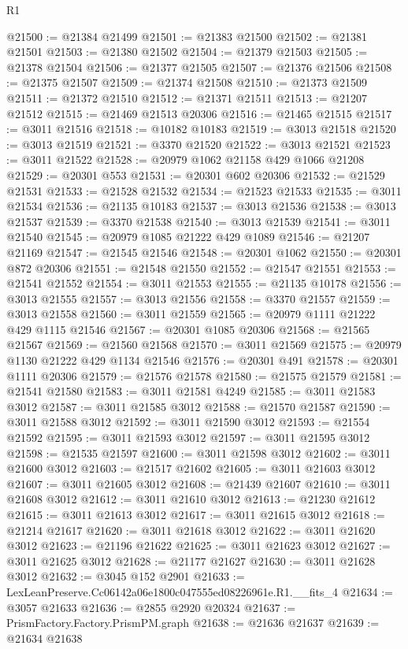 \begin{lexlean}{R1}
\begin{coremodule}
@21500 := @21384 @21499
@21501 := @21383 @21500
@21502 := @21381 @21501
@21503 := @21380 @21502
@21504 := @21379 @21503
@21505 := @21378 @21504
@21506 := @21377 @21505
@21507 := @21376 @21506
@21508 := @21375 @21507
@21509 := @21374 @21508
@21510 := @21373 @21509
@21511 := @21372 @21510
@21512 := @21371 @21511
@21513 := @21207 @21512
@21515 := @21469 @21513 @20306
@21516 := @21465 @21515
@21517 := @3011 @21516
@21518 := @10182 @10183
@21519 := @3013 @21518
@21520 := @3013 @21519
@21521 := @3370 @21520
@21522 := @3013 @21521
@21523 := @3011 @21522
@21528 := @20979 @1062 @21158 @429 @1066 @21208
@21529 := @20301 @553
@21531 := @20301 @602 @20306
@21532 := @21529 @21531
@21533 := @21528 @21532
@21534 := @21523 @21533
@21535 := @3011 @21534
@21536 := @21135 @10183
@21537 := @3013 @21536
@21538 := @3013 @21537
@21539 := @3370 @21538
@21540 := @3013 @21539
@21541 := @3011 @21540
@21545 := @20979 @1085 @21222 @429 @1089
@21546 := @21207 @21169
@21547 := @21545 @21546
@21548 := @20301 @1062
@21550 := @20301 @872 @20306
@21551 := @21548 @21550
@21552 := @21547 @21551
@21553 := @21541 @21552
@21554 := @3011 @21553
@21555 := @21135 @10178
@21556 := @3013 @21555
@21557 := @3013 @21556
@21558 := @3370 @21557
@21559 := @3013 @21558
@21560 := @3011 @21559
@21565 := @20979 @1111 @21222 @429 @1115 @21546
@21567 := @20301 @1085 @20306
@21568 := @21565 @21567
@21569 := @21560 @21568
@21570 := @3011 @21569
@21575 := @20979 @1130 @21222 @429 @1134 @21546
@21576 := @20301 @491
@21578 := @20301 @1111 @20306
@21579 := @21576 @21578
@21580 := @21575 @21579
@21581 := @21541 @21580
@21583 := @3011 @21581 @4249
@21585 := @3011 @21583 @3012
@21587 := @3011 @21585 @3012
@21588 := @21570 @21587
@21590 := @3011 @21588 @3012
@21592 := @3011 @21590 @3012
@21593 := @21554 @21592
@21595 := @3011 @21593 @3012
@21597 := @3011 @21595 @3012
@21598 := @21535 @21597
@21600 := @3011 @21598 @3012
@21602 := @3011 @21600 @3012
@21603 := @21517 @21602
@21605 := @3011 @21603 @3012
@21607 := @3011 @21605 @3012
@21608 := @21439 @21607
@21610 := @3011 @21608 @3012
@21612 := @3011 @21610 @3012
@21613 := @21230 @21612
@21615 := @3011 @21613 @3012
@21617 := @3011 @21615 @3012
@21618 := @21214 @21617
@21620 := @3011 @21618 @3012
@21622 := @3011 @21620 @3012
@21623 := @21196 @21622
@21625 := @3011 @21623 @3012
@21627 := @3011 @21625 @3012
@21628 := @21177 @21627
@21630 := @3011 @21628 @3012
@21632 := @3045 @152 @2901
@21633 := LexLeanPreserve.Cc06142a06e1800c047555ed08226961e.R1.__fits_4
@21634 := @3057 @21633
@21636 := @2855 @2920 @20324
@21637 := PrismFactory.Factory.PrismPM.graph
@21638 := @21636 @21637
@21639 := @21634 @21638

\end{coremodule}
\end{lexlean}
